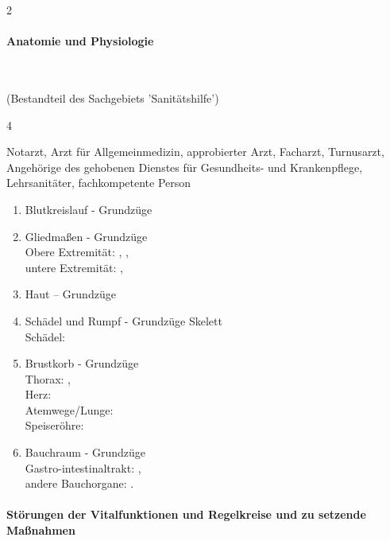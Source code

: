 \begin{WidePar}
\begin{multicols}{2}
\paragraph{Anatomie und Physiologie}~
  
  (Bestandteil des Sachgebiets 'Sanitätshilfe')
  
  \begin{inparadesc}
    \item[Stundenanzahl:] 4
    \item[Lehrkraft:]  Notarzt, Arzt für Allgemeinmedizin, approbierter Arzt,
    Facharzt, Turnusarzt,   Angehörige  des  gehobenen  Dienstes für Gesundheits-
    und Krankenpflege, Lehrsanitäter, fachkompetente Person
  \end{inparadesc}
  
  \begin{enumerate}
    \item    Blutkreislauf - Grundzüge \dotfill {}
    \item    Gliedmaßen - Grundzüge
    \\
    Obere Extremität: \dotfill {},
    ,
    \\
    untere Extremität: \dotfill {},
    \item    Haut -- Grundzüge \dotfill {}
    \item    Schädel und Rumpf - Grundzüge Skelett
    \\
    Schädel:  \dotfill {}
    \item    Brustkorb - Grundzüge
    \\
    Thorax:  \dotfill {}, \\
    Herz:  \dotfill {} \\
    Atemwege/Lunge:  \dotfill {}\\
    Speiseröhre:  \dotfill {}
    \item    Bauchraum - Grundzüge
    \\
    Gastro-intestinaltrakt: \dotfill
    , \\
    andere Bauchorgane: \dotfill
    .
  \end{enumerate}
  

\paragraph{Störungen der  Vitalfunktionen  und Regelkreise und zu setzende Maßnahmen}~
  

\end{multicols}
\end{WidePar}
